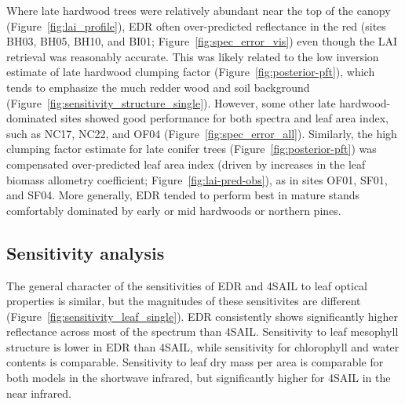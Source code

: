 Where late hardwood trees were relatively abundant near the top of the canopy (Figure~\ref{fig:lai_profile}), EDR often over-predicted reflectance in the red (sites BH03, BH05, BH10, and BI01; Figure~\ref{fig:spec_error_vis}) even though the LAI retrieval was reasonably accurate.
This was likely related to the low inversion estimate of late hardwood clumping factor (Figure~\ref{fig:posterior-pft}), which tends to emphasize the much redder wood and soil background (Figure~\ref{fig:sensitivity_structure_single}).
However, some other late hardwood-dominated sites showed good performance for both spectra and leaf area index, such as NC17, NC22, and OF04 (Figure~\ref{fig:spec_error_all}).
Similarly, the high clumping factor estimate for late conifer trees (Figure~\ref{fig:posterior-pft}) was compensated over-predicted leaf area index (driven by increases in the leaf biomass allometry coefficient; Figure~\ref{fig:lai-pred-obs}), as in sites OF01, SF01, and SF04.
More generally, EDR tended to perform best in mature stands comfortably dominated by early or mid hardwoods or northern pines.

\subsection{Sensitivity analysis}


The general character of the sensitivities of EDR and 4SAIL to leaf optical properties is similar,
but the magnitudes of these sensitivites are different (Figure~\ref{fig:sensitivity_leaf_single}).
EDR consistently shows significantly higher reflectance across most of the spectrum than 4SAIL\@.
Sensitivity to leaf mesophyll structure is lower in EDR than 4SAIL, while sensitivity for chlorophyll and water contents is comparable.
Sensitivity to leaf dry mass per area is comparable for both models in the shortwave infrared, but significantly higher for 4SAIL in the near infrared.

